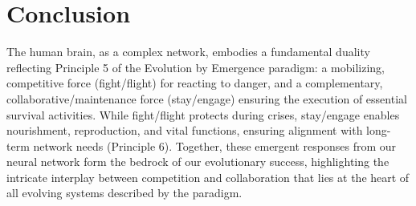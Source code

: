 \section{Conclusion}
The human brain, as a complex network, embodies a fundamental duality reflecting Principle 5 of the Evolution by Emergence paradigm: a mobilizing, competitive force (fight/flight) for reacting to danger, and a complementary, collaborative/maintenance force (stay/engage) ensuring the execution of essential survival activities. While fight/flight protects during crises, stay/engage enables nourishment, reproduction, and vital functions, ensuring alignment with long-term network needs (Principle 6). Together, these emergent responses from our neural network form the bedrock of our evolutionary success, highlighting the intricate interplay between competition and collaboration that lies at the heart of all evolving systems described by the paradigm. %
\cleardoublepage
